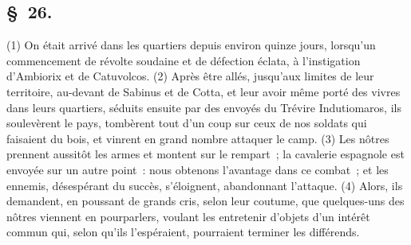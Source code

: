 \documentclass[french,twoside]{book} %
\begin{document}
\subsection[{§ 26.}]{ \textsc{§ 26.} }
\noindent (1) On était arrivé dans les quartiers depuis environ quinze jours, lorsqu’un commencement de révolte soudaine et de défection éclata, à l’instigation d’Ambiorix et de Catuvolcos. (2) Après être allés, jusqu’aux limites de leur territoire, au-devant de Sabinus et de Cotta, et leur avoir même porté des vivres dans leurs quartiers, séduits ensuite par des envoyés du Trévire Indutiomaros, ils soulevèrent le pays, tombèrent tout d’un coup sur ceux de nos soldats qui faisaient du bois, et vinrent en grand nombre attaquer le camp. (3) Les nôtres prennent aussitôt les armes et montent sur le rempart ; la cavalerie espagnole est envoyée sur un autre point : nous obtenons l’avantage dans ce combat ; et les ennemis, désespérant du succès, s’éloignent, abandonnant l’attaque. (4) Alors, ils demandent, en poussant de grands cris, selon leur coutume, que quelques-uns des nôtres viennent en pourparlers, voulant les entretenir d’objets d’un intérêt commun qui, selon qu’ils l’espéraient, pourraient terminer les différends.
\end{document}
